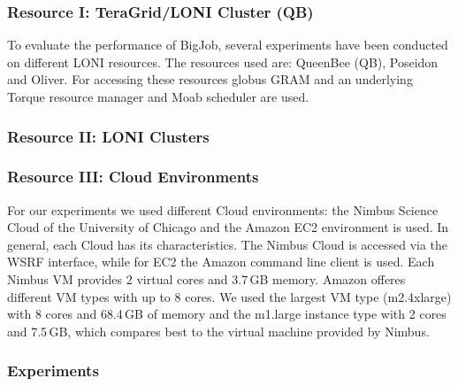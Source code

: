 \documentclass[3p,twocolumn]{elsarticle}
\begin{document}
\subsubsection*{Resource I: TeraGrid/LONI Cluster (QB)}

To evaluate the performance of BigJob, several experiments have been
conducted on different LONI resources. The resources used are:
QueenBee (QB), Poseidon and Oliver. For accessing these resources
globus GRAM and an underlying Torque resource manager and Moab
scheduler are used.

\subsubsection*{Resource II: LONI Clusters}


\subsubsection*{Resource III: Cloud Environments}

For our experiments we used different Cloud environments: the Nimbus
Science Cloud of the University of Chicago and the Amazon EC2
environment is used. In general, each Cloud has its
characteristics. The Nimbus Cloud is accessed via the WSRF interface,
while for EC2 the Amazon command line client is used. Each Nimbus VM
provides 2 virtual cores and 3.7\,GB memory.  Amazon offeres different
VM types with up to 8 cores. We used the largest VM type (m2.4xlarge)
with 8 cores and 68.4\,GB of memory and the m1.large instance type
with 2 cores and 7.5\,GB, which compares best to the virtual machine
provided by Nimbus.


\subsubsection{Experiments} 
\end{document}
